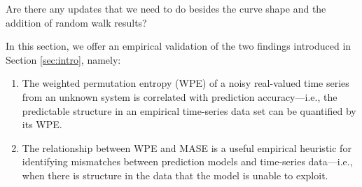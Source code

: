 


\alert{Are there any updates that we need to do besides the curve
  shape and the addition of random walk results?}

In this section, we offer an empirical validation of the two findings
introduced in Section \ref{sec:intro}, namely:

\begin{enumerate}

\item The weighted permutation entropy (WPE) of a noisy real-valued
  time series from an unknown system is correlated with prediction
  accuracy---i.e., the predictable structure in an empirical
  time-series data set can be quantified by its WPE.

\item The relationship between WPE and MASE is a useful empirical
  heuristic for identifying mismatches between prediction models and
  time-series data---i.e., when there is structure in the data that
  the model is unable to exploit.

\end{enumerate}




